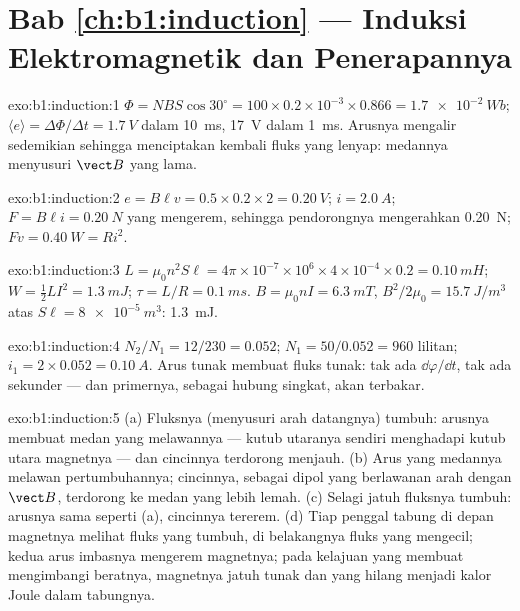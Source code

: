 \section*{Bab \ref{ch:b1:induction} --- Induksi Elektromagnetik dan Penerapannya}

\begin{solution}{exo:b1:induction:1}
$\Phi = NBS\cos30^\circ = 100 \times 0.2 \times 10^{-3} \times 0.866 = \qty{1.7e-2}{Wb}$;
$\langle e\rangle = \Delta\Phi/\Delta t = \qty{1.7}{V}$ dalam \qty{10}{ms}, \qty{17}{V} dalam
\qty{1}{ms}. Arusnya mengalir sedemikian sehingga menciptakan kembali fluks yang lenyap:
medannya menyusuri $\vect B$ yang lama.
\end{solution}

\begin{solution}{exo:b1:induction:2}
$e = B\ell v = 0.5 \times 0.2 \times 2 = \qty{0.20}{V}$; $i = \qty{2.0}{A}$; $F = B\ell i =
\qty{0.20}{N}$ yang mengerem, sehingga pendorongnya mengerahkan \qty{0.20}{N}; $Fv = \qty{0.40}{W}
= Ri^2$.
\end{solution}

\begin{solution}{exo:b1:induction:3}
$L = \mu_0n^2S\ell = 4\pi \times 10^{-7} \times 10^6 \times 4 \times 10^{-4} \times 0.2 =
\qty{0.10}{mH}$; $W = \tfrac12LI^2 = \qty{1.3}{mJ}$; $\tau = L/R = \qty{0.1}{ms}$.
$B = \mu_0nI = \qty{6.3}{mT}$, $B^2/2\mu_0 = \qty{15.7}{J/m^3}$ atas
$S\ell = \qty{8e-5}{m^3}$: \qty{1.3}{mJ}.
\end{solution}

\begin{solution}{exo:b1:induction:4}
$N_2/N_1 = 12/230 = 0.052$; $N_1 = 50/0.052 = 960$ lilitan; $i_1 = 2 \times 0.052 =
\qty{0.10}{A}$. Arus tunak membuat fluks tunak: tak ada $\dd\varphi/\dd t$, tak ada
 sekunder --- dan primernya, sebagai hubung singkat, akan terbakar.
\end{solution}

\begin{solution}{exo:b1:induction:5}
(a) Fluksnya (menyusuri arah datangnya) tumbuh: arusnya membuat medan
yang melawannya --- kutub utaranya sendiri menghadapi kutub utara magnetnya --- dan
cincinnya terdorong menjauh. (b) Arus yang medannya melawan pertumbuhannya;
cincinnya, sebagai dipol yang berlawanan arah dengan $\vect B$, terdorong ke medan
yang lebih lemah. (c) Selagi jatuh fluksnya tumbuh: arusnya sama seperti (a), cincinnya
tererem. (d) Tiap penggal tabung di depan magnetnya melihat fluks yang tumbuh,
di belakangnya fluks yang mengecil; kedua arus imbasnya mengerem magnetnya; pada
kelajuan yang membuat  mengimbangi beratnya, magnetnya jatuh
tunak dan  yang hilang menjadi kalor Joule dalam tabungnya.
\end{solution}

